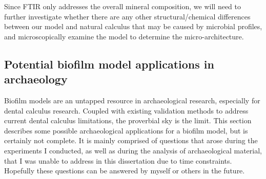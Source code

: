 \documentclass[
  b5paper,
]{book}
\begin{document}
Since FTIR only addresses the overall mineral composition, we will need
to further investigate whether there are any other structural/chemical
differences between our model and natural calculus that may be caused by
microbial profiles, and microscopically examine the model to determine
the micro-architecture.

\hypertarget{bfmodels-in-arch}{%
\subsection{Potential biofilm model applications in
archaeology}\label{bfmodels-in-arch}}

Biofilm models are an untapped resource in archaeological research,
especially for dental calculus research. Coupled with existing
validation methods to address current dental calculus limitations, the
proverbial sky is the limit. This section describes some possible
archaeological applications for a biofilm model, but is certainly not
complete. It is mainly comprised of questions that arose during the
experiments I conducted, as well as during the analysis of
archaeological material, that I was unable to address in this
dissertation due to time constraints. Hopefully these questions can be
answered by myself or others in the future.
\end{document}
